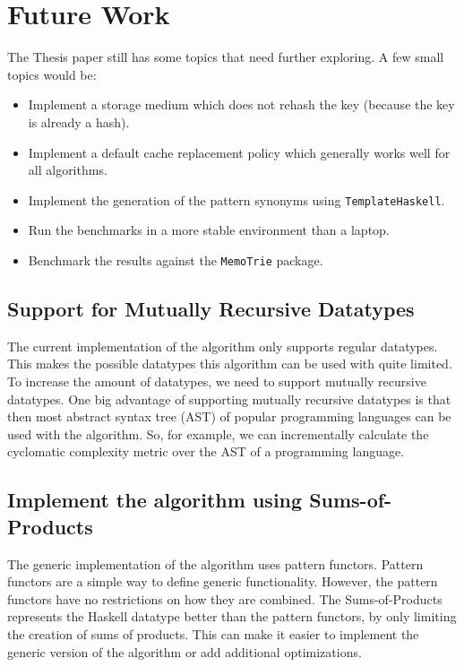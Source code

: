 \section{Future Work}

The Thesis paper still has some topics that need further exploring. A few small topics would be: 
\begin{itemize}
  \item Implement a storage medium which does not rehash the key (because the key is already a hash).
  \item Implement a default cache replacement policy which generally works well for all algorithms. 
  \item Implement the generation of the pattern synonyms using \texttt{TemplateHaskell}.
  \item Run the benchmarks in a more stable environment than a laptop.
  \item Benchmark the results against the \texttt{MemoTrie} package.
\end{itemize}

\subsection{Support for Mutually Recursive Datatypes}
The current implementation of the algorithm only supports regular datatypes. This makes the possible datatypes this algorithm can be used with quite limited. To increase the amount of datatypes, we need to support mutually recursive datatypes. One big advantage of supporting mutually recursive datatypes is that then most abstract syntax tree (AST) of popular programming languages can be used with the algorithm. So, for example, we can incrementally calculate the cyclomatic complexity metric over the AST of a programming language. 

\subsection{Implement the algorithm using Sums-of-Products}
The generic implementation of the algorithm uses pattern functors. Pattern functors are a simple way to define generic functionality. However, the pattern functors have no restrictions on how they are combined. The Sums-of-Products represents the Haskell datatype better than the pattern functors, by only limiting the creation of sums of products. This can make it easier to implement the generic version of the algorithm or add additional optimizations.

